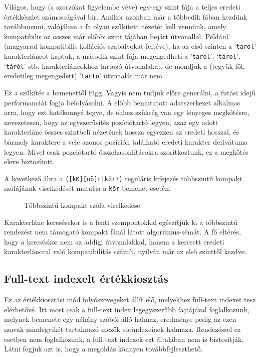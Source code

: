 \documentclass[
    parspace,
    noindent,
    nohyp,
]{elteiktdk}[2023/04/10]
\newcommand{\regextt}[1]{\texttt{\colorbox{verylightgray}{#1}}}
\begin{document}
Világos, hogy (a szorzókat figyelembe véve) egy-egy szint fája
a teljes eredeti értékkészlet számosságával bír.
Amikor azonban már a többedik fában kezdünk továbbmenni,
valójában a fa olyan szűkített nézetét kell vennünk,
amely kompatibilis az összes már előbbi szint fájában bejárt útvonallal.
Például (magyarral kompatibilis kollációs szabályokat feltéve),
ha az első szinten a '\texttt{tarol}' karakterláncot kaptuk,
a második szint fája megengedheti a '\texttt{tarol}', `\texttt{tárol}', '\texttt{táról}' stb.
karakterláncokhoz tartozó útvonalakat,
de mondjuk a (tegyük föl, eredetileg megengedett) '\texttt{tartó}' útvonalát már nem.

Ez a szűkítés a bemenettől függ.
Vagyis nem tudjuk előre generálni, a futási idejű performanciát fogja befolyásolni.
A előbb bemutatott adatszerkezet alkalmas arra, hogy ezt hatékonnyá tegye,
de ehhez szükség van egy lényeges megkötésre,
nevezetesen, hogy az egyszerűsítés pozíciótartó legyen,
azaz egy adott karakterlánc összes szintbeli nézetének hossza egyezzen az eredeti hosszal,
és bármely karaktere a vele azonos pozíción található eredeti karakter derivátuma legyen.
Mivel csak pozciótartó összehasonlításokra szorítkoztunk,
ez a megkötés eleve biztosított.

A következő ábra a \regextt{([kK][oö]r|kőr?)} reguláris kifejezés többszintű
kompakt szófájának viselkedését mutatja a \texttt{kőr} bemenet esetén:

\vspace{5pt}
\begin{figure}[H]
\centering

\caption{Többszintű kompakt szófa viselkedése}
\end{figure}
\vspace{-5pt}

Karakterlánc keresésekor is a fenti szempontokkal egészítjük ki
a többszintű rendezést nem támogató kompakt fánál látott algoritmus-sémát.
A fő eltérés, hogy a kereséskor nem az addigi útvonalakkal,
hanem a keresett eredeti karakterlánccal való kompatibilitás számít,
nyilván már az első szinttől kezdve.

\subsection{Full-text indexelt értékkiosztás}

Ez az értékkiosztási mód folyószövegeket állít elő, melyekhez full-text indexet tesz elérhetővé.
Itt most csak a full-text index legegyszerűbb fajtájával foglalkozunk,
melynek bemenete egy néhány szóból álló halmaz,
eredménye pedig az ezen szavak mindegyikét tartalmazó mezők sorindexeinek halmaza.
Rendezéssel ez esetben nem foglalkozunk, a full-text indexek ezt általában nem is biztosítják.
Látni fogjuk azt is, hogy a megoldás könnyen továbbfejleszthető.
\end{document}
